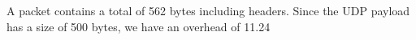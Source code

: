 A packet contains a total of 562 bytes including headers. Since the UDP payload has a size of 500 bytes, we have an overhead of 11.24%
